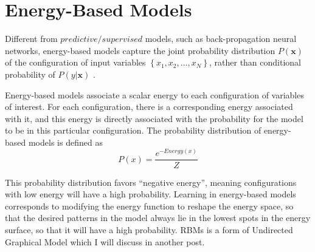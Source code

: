 \documentclass[11pt,fleqn, UTF8]{ctexbook} %
\begin{document}
\section{Energy-Based Models}
Different from $predictive/supervised$ models, such as back-propagation neural networks, energy-based models capture the joint probability distribution  $P(\mathbf{x})$  of the configuration of input variables $\left \{ x_{1}, x_{2},\dots ,x_{N} \right \}$, rather than conditional probability of $P(y|\mathbf{x})$ .

Energy-based models associate a scalar energy to each configuration of variables of interest. For each configuration, there is a corresponding energy associated with it, and this energy is directly associated with the probability for the model to be in this particular configuration. The probability distribution of energy-based models is defined as
\begin{equation}\label{add1.1}
    P(x)=\frac{e^{-Energy(x)}}{Z}
\end{equation}

This probability distribution favors “negative energy”, meaning configurations with low energy will have a high probability. Learning in energy-based models corresponds to modifying the energy function to reshape the energy space, so that the desired patterns in the model always lie in the lowest spots in the energy surface, so that it will have a high probability. RBMs is a form of Undirected Graphical Model which I will discuss in another post.
\end{document}
